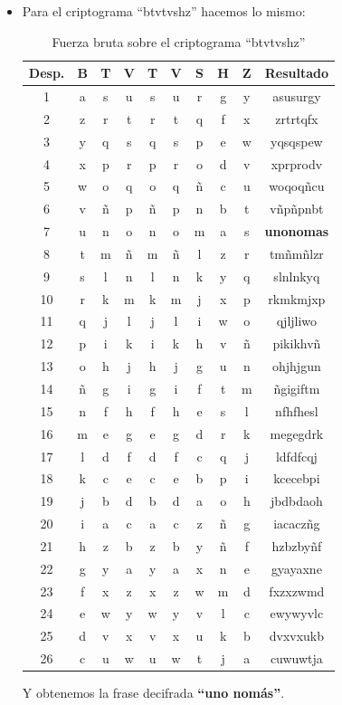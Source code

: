 \begin{itemize}
y obtenemos como resultado la palabra \textbf{"humus"}.


\item Para el criptograma ``btvtvshz'' hacemos lo mismo:

\begin{table}[H]
\centering
\begin{tabular}{|c|c|c|c|c|c|c|c|c|c|}
\hline
\textbf{Desp.} & \textbf{B} & \textbf{T} & \textbf{V} & \textbf{T} & \textbf{V} & \textbf{S} & \textbf{H} & \textbf{Z} & \textbf{Resultado} \\
\hline
1  & a & s & u & s & u & r & g & y & asusurgy \\
2  & z & r & t & r & t & q & f & x & zrtrtqfx \\
3  & y & q & s & q & s & p & e & w & yqsqspew \\
4  & x & p & r & p & r & o & d & v & xprprodv \\
5  & w & o & q & o & q & ñ & c & u & woqoq\~{n}cu \\
6  & v & ñ & p & ñ & p & n & b & t & v\~{n}p\~{n}pnbt \\
7  & u & n & o & n & o & m & a & s & \textbf{unonomas} \\
8  & t & m & ñ & m & ñ & l & z & r & tmñm\~{n}lzr \\
9  & s & l & n & l & n & k & y & q & slnlnkyq \\
10 & r & k & m & k & m & j & x & p & rkmkmjxp \\
11 & q & j & l & j & l & i & w & o & qjljliwo \\
12 & p & i & k & i & k & h & v & ñ & pikikhv\~{n} \\
13 & o & h & j & h & j & g & u & n & ohjhjgun \\
14 & ñ & g & i & g & i & f & t & m & \~{n}gigiftm \\
15 & n & f & h & f & h & e & s & l & nfhfhesl \\
16 & m & e & g & e & g & d & r & k & megegdrk \\
17 & l & d & f & d & f & c & q & j & ldfdfcqj \\
18 & k & c & e & c & e & b & p & i & kcecebpi \\
19 & j & b & d & b & d & a & o & h & jbdbdaoh \\
20 & i & a & c & a & c & z & ñ & g & iacacz\~{n}g \\
21 & h & z & b & z & b & y & ñ & f & hzbzby\~{n}f \\
22 & g & y & a & y & a & x & n & e & gyayaxne \\
23 & f & x & z & x & z & w & m & d & fxzxzwmd \\
24 & e & w & y & w & y & v & l & c & ewywyvlc \\
25 & d & v & x & v & x & u & k & b & dvxvxukb \\
26 & c & u & w & u & w & t & j & a & cuwuwtja \\
\hline
\end{tabular}
\caption{Fuerza bruta sobre el criptograma ``btvtvshz''}
\label{tab:cesar_enie}
\end{table}

Y obtenemos la frase decifrada \textbf{``uno nomás''}.


\end{itemize}

